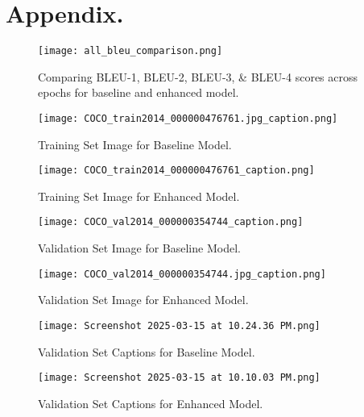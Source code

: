 \documentclass{article}
\theoremstyle{plain}
\theoremstyle{definition}
\theoremstyle{remark}
\begin{document}
\section{Appendix.}

\begin{figure}[htbp]
    \centering
    \texttt{[image: all\_bleu\_comparison.png]}
    \caption{Comparing BLEU-1, BLEU-2, BLEU-3, \& BLEU-4 scores across epochs for baseline and enhanced model.}
    \label{fig:example}
\end{figure}

\begin{figure}[htbp]
    \centering
    \texttt{[image: COCO\_train2014\_000000476761.jpg\_caption.png]}
    \caption{Training Set Image for Baseline Model.}
    \label{fig:example}
\end{figure}

\begin{figure}[htbp]
    \centering
    \texttt{[image: COCO\_train2014\_000000476761\_caption.png]}
    \caption{Training Set Image for Enhanced Model.}
    \label{fig:example}
\end{figure}

\begin{figure}[htbp]
    \centering
    \texttt{[image: COCO\_val2014\_000000354744\_caption.png]}
    \caption{Validation Set Image for Baseline Model.}
    \label{fig:example}
\end{figure}

\begin{figure}[htbp]
    \centering
    \texttt{[image: COCO\_val2014\_000000354744.jpg\_caption.png]}
    \caption{Validation Set Image for Enhanced Model.}
    \label{fig:example}
\end{figure}

\begin{figure}[htbp]
    \centering
    \texttt{[image: Screenshot 2025-03-15 at 10.24.36 PM.png]}
    \caption{Validation Set Captions for Baseline Model.}
    \label{fig:example}
\end{figure}

\begin{figure}[htbp]
    \centering
    \texttt{[image: Screenshot 2025-03-15 at 10.10.03 PM.png]}
    \caption{Validation Set Captions for Enhanced Model.}
    \label{fig:example}
\end{figure}

\end{document}
